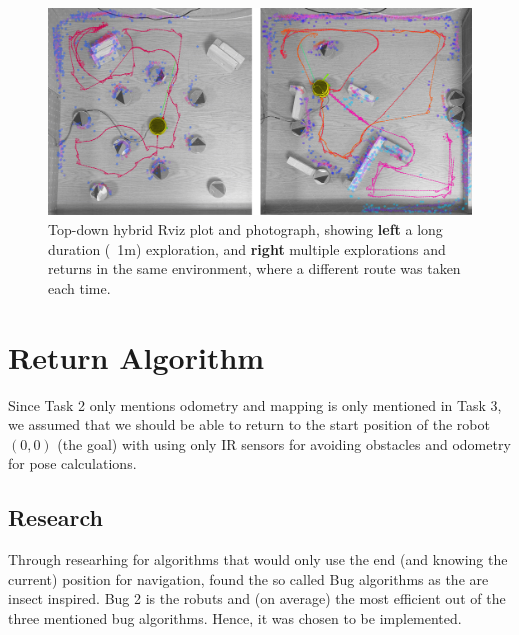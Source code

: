\documentclass[11pt, a4paper]{article}
\begin{document}
\begin{figure}[h]
  \begin{center}
    \includegraphics[width=38em]{../assets/merged_top_fig.png}
  \end{center}
  \caption{Top-down hybrid Rviz plot and photograph, showing \textbf{left} a long duration (~1m)
    exploration, and \textbf{right} multiple explorations and returns in the same environment, where a
    different route was taken each time.}
\end{figure}

\newpage
\section{Return Algorithm}
\label{Return Algorithm}

Since Task 2 only mentions odometry and mapping is only mentioned in Task 3, we assumed that we should
be able to return to the start position of the robot ${(0,0)}$ (the goal) with using only IR sensors for avoiding obstacles
and odometry for pose calculations. 



\subsection{Research}

Through researhing for algorithms that would only use the end (and knowing the current) position for navigation, 
found the so called Bug algorithms as the are insect inspired. Bug 2 is the robuts and 
(on average) the most efficient out of the three mentioned bug algorithms. 
Hence, it was chosen to be implemented.


\end{document}
